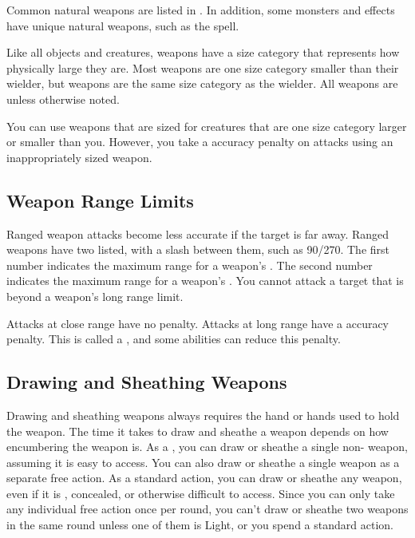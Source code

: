             Common natural weapons are listed in .
            In addition, some monsters and effects have unique natural weapons, such as the  spell.

         Like all objects and creatures, weapons have a size category that represents how physically large they are. Most weapons are one size category smaller than their wielder, but  weapons are the same size category as the wielder.
        All weapons are  unless otherwise noted.

        \label{Inappropriately Sized Weapons} You can use weapons that are sized for creatures that are one size category larger or smaller than you.
        However, you take a  accuracy penalty on attacks using an inappropriately sized weapon.

    \subsection{Weapon Range Limits}\label{Weapon Range Limits}
        Ranged weapon attacks become less accurate if the target is far away.
        Ranged weapons have two  listed, with a slash between them, such as 90/270.
        The first number indicates the maximum range for a weapon's .
        The second number indicates the maximum range for a weapon's .
        You cannot attack a target that is beyond a weapon's long range limit.

        Attacks at close range have no penalty.
        Attacks at long range have a  accuracy penalty.
        This is called a , and some abilities can reduce this penalty.

    \subsection{Drawing and Sheathing Weapons}\label{Drawing and Sheathing Weapons}
        Drawing and sheathing weapons always requires the hand or hands used to hold the weapon.
        The time it takes to draw and sheathe a weapon depends on how encumbering the weapon is.
        As a , you can draw or sheathe a single non- weapon, assuming it is easy to access.
        You can also draw or sheathe a single  weapon as a separate free action.
        As a standard action, you can draw or sheathe any weapon, even if it is , concealed, or otherwise difficult to access.
        Since you can only take any individual free action once per round, you can't draw or sheathe two weapons in the same round unless one of them is Light, or you spend a standard action.

